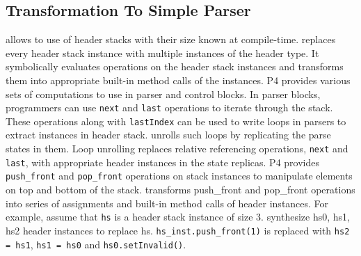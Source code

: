 \documentclass[letterpaper,twocolumn,10pt]{article}
\begin{document}

\subsection{Transformation To Simple Parser}
\label{subsection:header-stacks-variable-length-headers}
\ulang allows to use of header stacks with their size known at compile-time. 
\ucomp replaces every header stack instance with multiple instances of the header type. 
It symbolically evaluates operations on the header stack instances and transforms them into appropriate built-in method calls of the instances.
P4 provides various sets of computations to use in parser and control blocks.
In parser blocks, programmers can use \texttt{next} and \texttt{last} operations to iterate through the stack.
These operations along with \texttt{lastIndex} can be used to write loops in parsers to extract instances in header stack.
\ucomp unrolls such loops by replicating the parse states in them.
Loop unrolling replaces relative referencing operations, \texttt{next} and \texttt{last}, with appropriate header instances in the state replicas.
P4 provides \texttt{push\_front} and \texttt{pop\_front} operations on stack instances to manipulate elements on top and bottom of the stack.
\ucomp transforms push\_front and pop\_front operations into series of assignments and built-in method calls of header instances.
For example, assume that \texttt{hs} is a header stack instance of size 3. 
\ucomp synthesize hs0, hs1, hs2 header instances to replace hs.
\texttt{hs\_inst.push\_front(1)} is replaced with \texttt{hs2 = hs1}, \texttt{hs1 = hs0} and \texttt{hs0.setInvalid()}.
\end{document}
